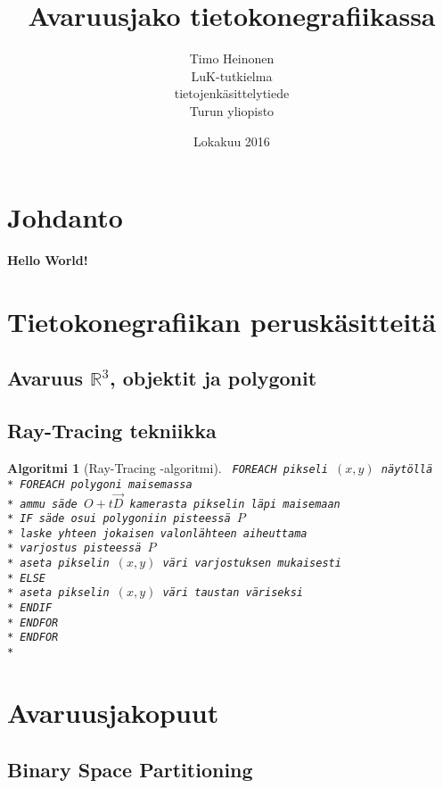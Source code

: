 \documentclass[a4paper,12pt, titlepage]{article}
\title{Avaruusjako tietokonegrafiikassa}
\author{Timo Heinonen \\LuK-tutkielma \\ tietojenkäsittelytiede \\ Turun yliopisto}
\date{Lokakuu 2016}
\theoremstyle{break}
\theoremstyle{algostyle}
\newtheorem{alg}{Algoritmi}[section]
\newcommand{\R}{\mathbb{R}}
\newcommand{\tab}[1][0.5cm]{\hspace*{#1}} %
\newcommand{\code}[1]{\texttt{#1}} %
\begin{document}
\maketitle

\setcounter{tocdepth}{2} %
\tableofcontents

\newpage
\section{Johdanto}
\textbf{Hello World!}

\section{Tietokonegrafiikan peruskäsitteitä}
\subsection{Avaruus $\R ^3$, objektit ja polygonit} 
\subsection{Ray-Tracing tekniikka}
\begin{alg}[Ray-Tracing -algoritmi]
\code{
FOREACH pikseli $(x, y)$ näytöllä \\*
\tab FOREACH polygoni maisemassa\\*
\tab\tab ammu säde $O+t\vec{D}$ kamerasta pikselin läpi maisemaan \\*
\tab\tab IF säde osui polygoniin pisteessä $P$\\*
\tab\tab\tab laske yhteen jokaisen valonlähteen aiheuttama \\*
\tab\tab\tab varjostus pisteessä $P$  \\*
\tab\tab\tab aseta pikselin $(x, y)$ väri varjostuksen mukaisesti \\*
\tab\tab ELSE \\*
\tab\tab\tab aseta pikselin $(x, y)$ väri taustan väriseksi \\*
\tab\tab ENDIF \\*
\tab ENDFOR \\*
ENDFOR\\*}
\end{alg}

\section{Avaruusjakopuut}
\subsection{Binary Space Partitioning}
\end{document}
